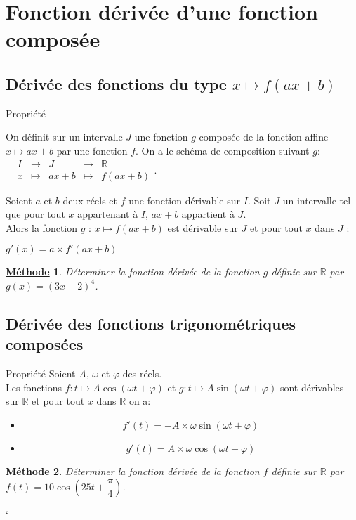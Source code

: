 \documentclass[11pt,a4paper]{article}
\def\R{{\mathbb R}}
\theoremstyle{break}
\newtheorem{Meth}{\underline{Méthode}}
\begin{document}
\section{Fonction dérivée d'une fonction composée} 

\subsection{Dérivée des fonctions du type $x \mapsto f(ax+b)$}
	\begin{bclogo}[couleur = yellow!30, arrondi = 0.1,logo=\bcbook]{Propriété}

On définit sur un intervalle $J$ une fonction $g$ composée de la fonction affine $x \mapsto ax+b$ par une fonction $f$. On a le schéma de composition suivant $g$: $\begin{array}{l|rclcl}
& I & \longrightarrow & J  & \longrightarrow & \R\\
& x & \longmapsto & ax+b &  \longmapsto & f(ax+b) \end{array}$. 

	Soient $a$ et $b$ deux réels et $f$ une fonction dérivable sur $I$. Soit $J$ un intervalle tel que pour tout $x$ appartenant à $I$, $ax+b$ appartient à $J$. \\
	Alors la fonction $g$ : $x \mapsto f(ax+b) $ est dérivable sur $J$ et pour tout $x$ dans $J$ :  
	\begin{center}
	$g'(x)=a \times f'(ax+b)$
	\end{center}
\end{bclogo}

\begin{Meth}
Déterminer la fonction dérivée de la fonction $g$ définie sur $\R$ par $g(x)=(3x-2)^4$.
\end{Meth} 



\subsection{Dérivée des fonctions trigonométriques composées}

	\begin{bclogo}[couleur = yellow!30, arrondi = 0.1,logo=\bcbook]{Propriété}
	Soient $A$, $\omega$ et $\varphi$ des réels. \\
	Les fonctions $f : t \longmapsto A\cos(\omega t+\varphi)$ et $g:t \longmapsto  A\sin(\omega t+\varphi) $ sont dérivables sur $\R$ et pour tout $x$ dans $\R$ on a:\begin{itemize}
		\item $$f'(t)=-A \times \omega \sin(\omega t+\varphi)$$
		\item $$g'(t)=A \times \omega \cos(\omega t+\varphi)$$ 
	\end{itemize}
	 
	\end{bclogo}

\begin{Meth}
Déterminer la fonction dérivée de la fonction $f$ définie sur $\R$ par $f(t)=10\cos(25t+\dfrac{\pi}{4})$.
\end{Meth} 



		

	

`
\end{document}
